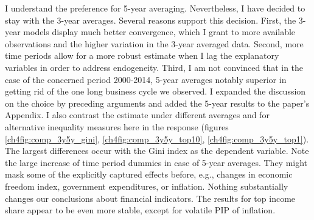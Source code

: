 \begin{enumerate}[resume]
    I understand the preference for 5-year averaging. Nevertheless, I have decided to stay with the 3-year averages. Several reasons support this decision. First, the 3-year models display much better convergence, which I grant to more available observations and the higher variation in the 3-year averaged data. Second, more time periods allow for a more robust estimate when I lag the explanatory variables in order to address endogeneity. Third, I am not convinced that in the case of the concerned period 2000-2014, 5-year averages notably superior in getting rid of the one long business cycle we observed. I expanded the discussion on the choice by preceding arguments and added the 5-year results to the paper's Appendix. I also contrast the estimate under different averages and for alternative inequality measures here in the response (figures \ref{ch4fig:comp_3y5y_gini}, \ref{ch4fig:comp_3y5y_top10}, \ref{ch4fig:comp_3y5y_top1}). The largest differences occur with the Gini index as the dependent variable. Note the large increase of time period dummies in case of 5-year averages. They might mask some of the explicitly captured effects before, e.g., changes in economic freedom index, government expenditures, or inflation. Nothing substantially changes our conclusions about financial indicators. The results for top income share appear to be even more stable, except for volatile \ac{PIP} of inflation.


\end{enumerate}
